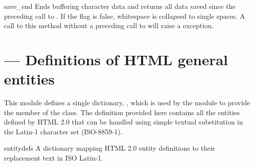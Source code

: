\begin{methoddesc}{save_end}{}
Ends buffering character data and returns all data saved since the
preceding call to .  If the  flag is
false, whitespace is collapsed to single spaces.  A call to this
method without a preceding call to  will raise a
 exception.
\end{methoddesc}



\section{ ---
         Definitions of HTML general entities}


This module defines a single dictionary, , which is
used by the  module to provide the
 member of the  class.  The
definition provided here contains all the entities defined by HTML 2.0 
that can be handled using simple textual substitution in the Latin-1
character set (ISO-8859-1).


\begin{datadesc}{entitydefs}
  A dictionary mapping HTML 2.0 entity definitions to their
  replacement text in ISO Latin-1.
\end{datadesc}
